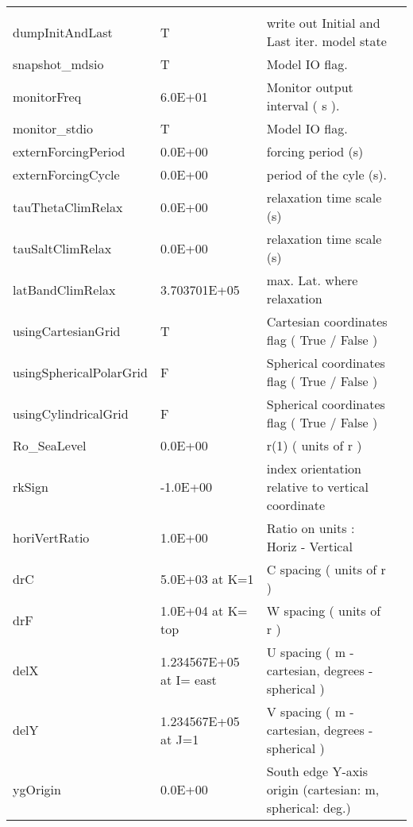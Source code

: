 \begin{table}
\begin{tabular}{lllc}
    &  %
    \\
   dumpInitAndLast  &                     T
    &   write out Initial and Last iter. model state 
    &  %
    \\
   snapshot\_mdsio   &                     T
    &   Model IO flag. 
    &  %
    \\
   monitorFreq   &                   6.0E+01
    &   Monitor output interval ( s ). 
    &  %
    \\
   monitor\_stdio   &                     T
    &   Model IO flag. 
    &  %
    \\
   externForcingPeriod   &                   0.0E+00
    &   forcing period (s) 
    &  %
    \\
   externForcingCycle   &                   0.0E+00
    &   period of the cyle (s). 
    &  %
    \\
   tauThetaClimRelax   &                   0.0E+00
    &   relaxation time scale (s) 
    &  %
    \\
   tauSaltClimRelax   &                   0.0E+00
    &   relaxation time scale (s) 
    &  %
    \\
   latBandClimRelax   &                   3.703701E+05
    &   max. Lat. where relaxation 
    &  %
    \\
   usingCartesianGrid   &                     T
    &   Cartesian coordinates flag ( True / False ) 
    &  %
    \\
   usingSphericalPolarGrid   &                     F
    &   Spherical coordinates flag ( True / False ) 
    &  %
    \\
   usingCylindricalGrid   &                     F
    &   Spherical coordinates flag ( True / False ) 
    &  %
    \\
   Ro\_SeaLevel   &                   0.0E+00
    &   r(1) ( units of r ) 
    &  %
    \\
   rkSign   &                  -1.0E+00
    &   index orientation relative to vertical coordinate 
    &  %
    \\
   horiVertRatio   &                   1.0E+00
    &   Ratio on units : Horiz - Vertical 
    &  %
    \\
   drC   &                   5.0E+03 at K=1
    &   C spacing ( units of r ) 
    &  %
    \\
   drF   &      1.0E+04 at K= top
    &   W spacing ( units of r ) 
    &  %
    \\
   delX   &      1.234567E+05  at I= east
    &   U spacing ( m - cartesian, degrees - spherical ) 
    &  %
    \\
   delY   &                   1.234567E+05  at J=1 
    &   V spacing ( m - cartesian, degrees - spherical ) 
    &  %
    \\
   ygOrigin  &                   0.0E+00
    &   South edge Y-axis origin (cartesian: m, spherical: deg.) 


\end{tabular}
\end{table}

